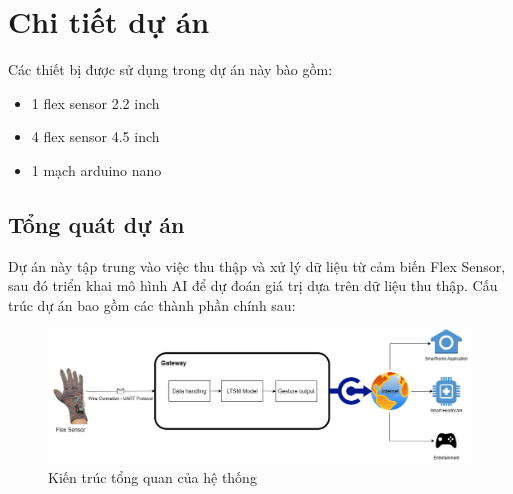 \section{Chi tiết dự án}

\indent Các thiết bị được sử dụng trong dự án này bào gồm: 
\begin{itemize}
    \item 1 flex sensor 2.2 inch
    \item 4 flex sensor 4.5 inch
    \item 1 mạch arduino nano
\end{itemize}

\subsection{Tổng quát dự án}

\indent Dự án này tập trung vào việc thu thập và xử lý dữ liệu từ cảm biến Flex Sensor, sau đó triển khai mô hình AI để dự đoán giá trị dựa trên dữ liệu thu thập. Cấu trúc dự án bao gồm các thành phần chính sau:

\begin{figure}[H]
    \centering
    \includegraphics[scale=0.25]{Images/Theoretical basis/FlexArchitecture (1).png}
    \caption{Kiến trúc tổng quan của hệ thống}
    \label{fig:ProjectArchitecture}
\end{figure}

